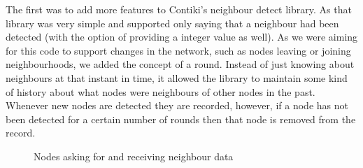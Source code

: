 The first was to add more features to Contiki's neighbour detect library. As that library was very simple and supported only saying that a neighbour had been detected (with the option of providing a integer value as well). As we were aiming for this code to support changes in the network, such as nodes leaving or joining neighbourhoods, we added the concept of a round. Instead of just knowing about neighbours at that instant in time, it allowed the library to maintain some kind of history about what nodes were neighbours of other nodes in the past. Whenever new nodes are detected they are recorded, however, if a node has not been detected for a certain number of rounds then that node is removed from the record.

\begin{figure}[ht!]
\centering
{}
\caption{Nodes asking for and receiving neighbour data}
\end{figure}

